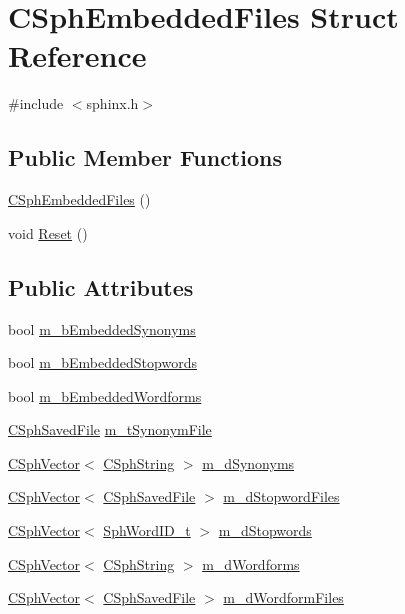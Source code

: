 \hypertarget{structCSphEmbeddedFiles}{\section{C\-Sph\-Embedded\-Files Struct Reference}
\label{structCSphEmbeddedFiles}
}


{\ttfamily \#include $<$sphinx.\-h$>$}

\subsection*{Public Member Functions}
\begin{DoxyCompactItemize}
\item 
\hyperlink{structCSphEmbeddedFiles_a9a7fa08aeb838705ab15ac61c29bc926}{C\-Sph\-Embedded\-Files} ()
\item 
void \hyperlink{structCSphEmbeddedFiles_a2eab8d05a40b60c7e53b66488249c475}{Reset} ()
\end{DoxyCompactItemize}
\subsection*{Public Attributes}
\begin{DoxyCompactItemize}
\item 
bool \hyperlink{structCSphEmbeddedFiles_a2af97c6f2328aad33626aefee58aa242}{m\-\_\-b\-Embedded\-Synonyms}
\item 
bool \hyperlink{structCSphEmbeddedFiles_acc96e6e0de4a04ef9a8ad546af1eaf19}{m\-\_\-b\-Embedded\-Stopwords}
\item 
bool \hyperlink{structCSphEmbeddedFiles_ae943e15dec55fa150d52b86adf8002e0}{m\-\_\-b\-Embedded\-Wordforms}
\item 
\hyperlink{structCSphSavedFile}{C\-Sph\-Saved\-File} \hyperlink{structCSphEmbeddedFiles_ac05454c5bc44ac558882fa5358f5c7cc}{m\-\_\-t\-Synonym\-File}
\item 
\hyperlink{classCSphVector}{C\-Sph\-Vector}$<$ \hyperlink{structCSphString}{C\-Sph\-String} $>$ \hyperlink{structCSphEmbeddedFiles_a3be3376f91b57e2114b89f07fa2c0086}{m\-\_\-d\-Synonyms}
\item 
\hyperlink{classCSphVector}{C\-Sph\-Vector}$<$ \hyperlink{structCSphSavedFile}{C\-Sph\-Saved\-File} $>$ \hyperlink{structCSphEmbeddedFiles_ac4d822c9f44386a0181674a416bffd0e}{m\-\_\-d\-Stopword\-Files}
\item 
\hyperlink{classCSphVector}{C\-Sph\-Vector}$<$ \hyperlink{sphinx_8h_a80a94d5984fdf9214a98f3e5e65df963}{Sph\-Word\-I\-D\-\_\-t} $>$ \hyperlink{structCSphEmbeddedFiles_afbff57849cb25a80b888b4a27ab8cb76}{m\-\_\-d\-Stopwords}
\item 
\hyperlink{classCSphVector}{C\-Sph\-Vector}$<$ \hyperlink{structCSphString}{C\-Sph\-String} $>$ \hyperlink{structCSphEmbeddedFiles_a049ae6bda5366d5fd4d9e7c4882edff9}{m\-\_\-d\-Wordforms}
\item 
\hyperlink{classCSphVector}{C\-Sph\-Vector}$<$ \hyperlink{structCSphSavedFile}{C\-Sph\-Saved\-File} $>$ \hyperlink{structCSphEmbeddedFiles_a11b7ef012d536329f9bd21d5c42e4bb1}{m\-\_\-d\-Wordform\-Files}
\end{DoxyCompactItemize}


